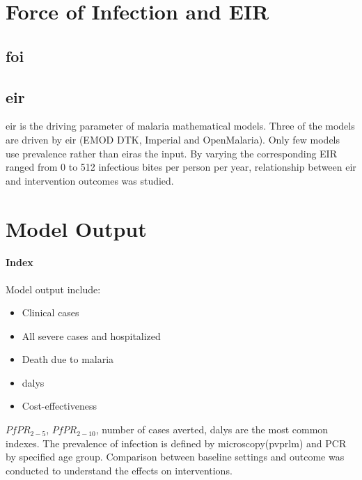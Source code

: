 \documentclass[a4paper, 12pt, twoside]{article}
\begin{document}
\section{Force of Infection and EIR}%
\label{sec:force_of_infection_and_eir}

\subsection{\texorpdfstring{\gls{foi}}{Force of Infection}}%
\label{sub:foi}

\subsection{\texorpdfstring{\gls{eir}}{EIR}}%
\label{sub:eir}
\gls{eir} is the driving parameter of malaria mathematical models.
Three of the models are driven by \gls{eir} (EMOD DTK, Imperial and OpenMalaria).
Only few models use prevalence rather than \gls{eir}as the input.
By varying the corresponding EIR ranged from 0 to 512 infectious bites per person per year, relationship between \gls{eir} and intervention outcomes was studied.

\section{Model Output}%
\label{sec:model_output}

\paragraph{Index}%
\label{par:index}
Model output include:
\begin{itemize}
	\item Clinical cases
	\item All severe cases and hospitalized
	\item Death due to malaria
	\item \gls{dalys}
	\item Cost-effectiveness
\end{itemize}
$PfPR_{2-5}$, $PfPR_{2-10}$\cite{Penny2016}, number of cases averted, \gls{dalys} are the most common indexes.
The prevalence of infection is defined by microscopy(\gls{pvprlm}) and PCR by specified age group.
Comparison between baseline settings and outcome was conducted to understand the effects on interventions.
\end{document}
